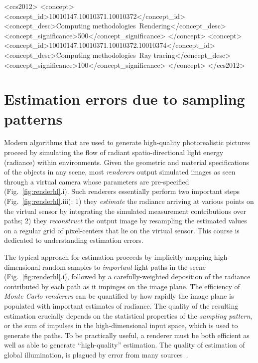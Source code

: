 \documentclass{acmsiggraph}
\begin{document}
%
%
\begin{CCSXML}
<ccs2012>
<concept>
<concept_id>10010147.10010371.10010372</concept_id>
<concept_desc>Computing methodologies~Rendering</concept_desc>
<concept_significance>500</concept_significance>
</concept>
<concept>
<concept_id>10010147.10010371.10010372.10010374</concept_id>
<concept_desc>Computing methodologies~Ray tracing</concept_desc>
<concept_significance>100</concept_significance>
</concept>
</ccs2012>
\end{CCSXML}

%
%


\keywordlist


\printcopyright

\section{Estimation errors due to sampling patterns}
Modern algorithms that are used to generate high-quality photorealistic pictures proceed by simulating the flow of radiant spatio-directional light energy (radiance) within environments. Given the geometric and material specifications of the objects in any scene, most \textit{renderers} output simulated images as seen through a virtual camera whose parameters are pre-specified (Fig.~\ref{fig:renderhl}.i). Such renderers essentially perform two important steps (Fig.~\ref{fig:renderhl}.iii): 1) they \textit{estimate} the radiance arriving at various points on the virtual sensor by integrating the simulated measurement contributions over paths; 2) they \textit{reconstruct} the output image by resampling the estimated values on a regular grid of pixel-centers that lie on the virtual sensor. This course is dedicated to understanding estimation errors.

The typical approach for estimation proceeds by implicitly mapping high-dimensional random samples to \textit{important} light paths in the scene (Fig.~\ref{fig:renderhl}.i), followed by a carefully-weighted deposition of the radiance contributed by each path as it impinges on the image plane. The efficiency of \textit {Monte Carlo renderers} can be quantified by how rapidly the image plane is populated with important estimates of radiance. The quality of the resulting estimation crucially depends on the statistical properties of the \textit {sampling pattern}, or the sum of impulses in the high-dimensional input space, which is used to generate the paths. To be practically useful, a renderer must be both efficient as well as able to generate ``high-quality'' estimation. The quality of estimation of global illumination, is plagued by error from many sources~\cite{arvo1994framework}. 
\end{document}
